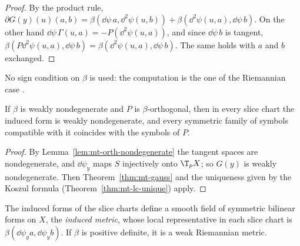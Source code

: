 \begin{proof}
  \leanok
  By the product rule,
  $\partial G(y)(u)(a, b) = \beta(\dd\psi\, a, \dd^2\psi(u, b)) + \beta(\dd^2\psi(u, a), \dd\psi\, b)$.
  On the other hand $\dd\psi\,\Gamma(u, a) = -P(\dd^2\psi(u, a))$, and since $\dd\psi\, b$ is
  tangent, $\beta(P \dd^2\psi(u, a), \dd\psi\, b) = \beta(\dd^2\psi(u, a), \dd\psi\, b)$. The same
  holds with $a$ and $b$ exchanged.
\end{proof}

No sign condition on $\beta$ is used: the computation is the one of the Riemannian case
\cite[\S10.1.1]{Lar26}.

\begin{theorem}
  \label{thm:mt-projector-levi-civita}
  \leanok
  If $\beta$ is weakly nondegenerate and $P$ is $\beta$-orthogonal, then in every slice chart the
  induced form is weakly nondegenerate, and every symmetric family of symbols compatible with it
  coincides with the symbols of $P$.
\end{theorem}

\begin{proof}
  \leanok
  By Lemma~\ref{lem:mt-orth-nondegenerate} the tangent spaces are nondegenerate, and
  $\dd\psi_y$ maps $S$ injectively onto $\T_p X$; so $G(y)$ is weakly nondegenerate. Then
  Theorem~\ref{thm:mt-gauss} and the uniqueness given by the Koszul formula
  (Theorem~\ref{thm:mt-lc-unique}) apply.
\end{proof}

\begin{theorem}
  \label{thm:mt-induced-metric}
  \leanok
  The induced forms of the slice charts define a smooth field of symmetric bilinear forms on $X$,
  the \emph{induced metric}, whose local representative in each slice chart is
  $\beta(\dd\psi_y a, \dd\psi_y b)$. If $\beta$ is positive definite, it is a weak Riemannian
  metric.
\end{theorem}

